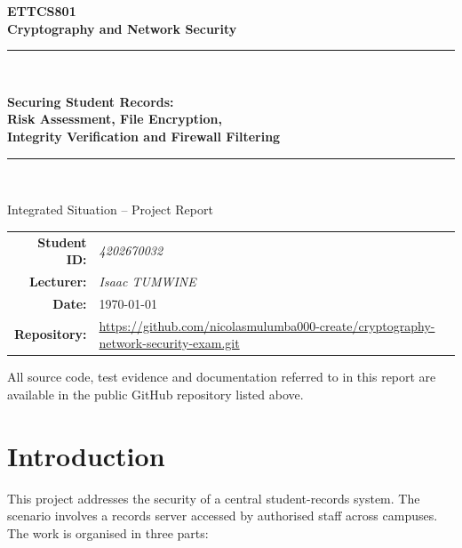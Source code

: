 \documentclass[11pt,a4paper]{article}
\begin{document}
\begin{titlepage}
\centering
\vspace*{2cm}
{\Large\bfseries ETTCS801\\[0.3cm] Cryptography and Network Security\par}
\vspace{1.2cm}
\rule{\textwidth}{1.2pt}\\[0.5cm]
{\Huge\bfseries Securing Student Records:\\[0.2cm]
Risk Assessment, File Encryption,\\[0.2cm]
Integrity Verification and Firewall Filtering\par}
\rule{\textwidth}{1.2pt}\\[1.5cm]

{\large Integrated Situation -- Project Report\par}
\vspace{2cm}

\begin{tabular}{rl}

  \textbf{Student ID:}  & \textit{4202670032} \\
  \textbf{Lecturer:}    & \textit{Isaac TUMWINE} \\
  \textbf{Date:}        & \today \\
  \textbf{Repository:}  & \url{https://github.com/nicolasmulumba000-create/cryptography-network-security-exam.git}
\end{tabular}

\vfill
{\small All source code, test evidence and documentation referred to in this report
are available in the public GitHub repository listed above.\par}
\end{titlepage}

\tableofcontents
\newpage

\section{Introduction}
This project addresses the security of a central student-records system.
The scenario involves a records server accessed by authorised staff across
campuses. The work is organised in three parts:
\end{document}
